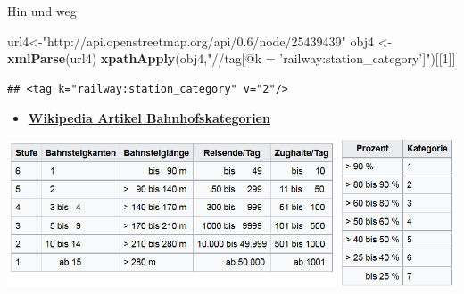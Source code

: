 \documentclass[ignorenonframetext,]{beamer}
\newenvironment{Shaded}{\begin{snugshade}}{\end{snugshade}}
\newcommand{\DecValTok}[1]{\textcolor[rgb]{0.00,0.00,0.81}{#1}}
\newcommand{\KeywordTok}[1]{\textcolor[rgb]{0.13,0.29,0.53}{\textbf{#1}}}
\newcommand{\NormalTok}[1]{#1}
\newcommand{\StringTok}[1]{\textcolor[rgb]{0.31,0.60,0.02}{#1}}
\providecommand{\tightlist}{%
  \setlength{\itemsep}{0pt}\setlength{\parskip}{0pt}}
\begin{document}
\begin{frame}[fragile]{Hin und weg}
\protect\hypertarget{hin-und-weg}{}

\begin{Shaded}
\begin{Highlighting}[]
\NormalTok{url4<-}\StringTok{"http://api.openstreetmap.org/api/0.6/node/25439439"}
\NormalTok{obj4 <-}\StringTok{ }\KeywordTok{xmlParse}\NormalTok{(url4)}
\KeywordTok{xpathApply}\NormalTok{(obj4,}\StringTok{"//tag[@k = 'railway:station_category']"}\NormalTok{)[[}\DecValTok{1}\NormalTok{]]}
\end{Highlighting}
\end{Shaded}

\begin{verbatim}
## <tag k="railway:station_category" v="2"/>
\end{verbatim}

\begin{itemize}
\tightlist
\item
  \href{https://de.wikipedia.org/wiki/Bahnhofskategorie}{\textbf{Wikipedia
  Artikel Bahnhofskategorien}}
\end{itemize}

\includegraphics{figure/Bahnhofskategorien.PNG}

\end{frame}
\end{document}
